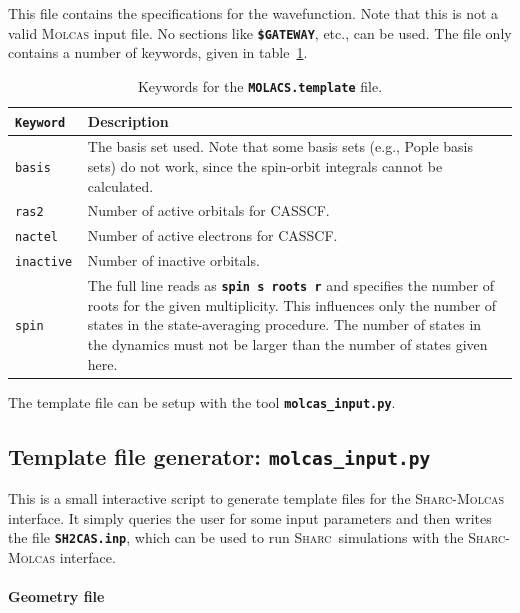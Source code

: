 \documentclass[a4paper,11pt,DIV=15,openany,twoside=false]{scrbook}
\newcommand{\sharc}{\textsc{Sharc}}
\newcommand{\ttt}[1]{\textbf{\texttt{#1}}}
\begin{document}
This file contains the specifications for the wavefunction. Note that this is not a valid \textsc{Molcas} input file. No sections like \ttt{\$GATEWAY}, etc., can be used. The file only contains a number of keywords, given in table~\ref{tab:molcas_temp}.

\begin{table}
  \centering
  \caption{Keywords for the \ttt{MOLACS.template} file.}
  \label{tab:molcas_temp}
  \begin{tabular}{>{\tt}lp{12cm}}
  \toprule
  Keyword       &Description\\
  \midrule
basis           &The basis set used. Note that some basis sets (e.g., Pople basis sets) do not work, since the spin-orbit integrals cannot be calculated.\\
ras2            &Number of active orbitals for CASSCF.\\
nactel          &Number of active electrons for CASSCF.\\
inactive        &Number of inactive orbitals.\\
spin            &The full line reads as \ttt{spin s roots r} and specifies the number of roots for the given multiplicity. This influences only the number of states in the state-averaging procedure. The number of states in the dynamics must not be larger than the number of states given here.\\
  \bottomrule
  \end{tabular}
\end{table}

The template file can be setup with the tool \ttt{molcas\_input.py}.

\subsection{Template file generator: \ttt{molcas\_input.py}}\label{sec:molcas_input.py}

This is a small interactive script to generate template files for the \sharc-\textsc{Molcas} interface. It simply queries the user for some input parameters and then writes the file \ttt{SH2CAS.inp}, which can be used to run \sharc\ simulations with the \sharc-\textsc{Molcas} interface.

\paragraph{Geometry file}
\end{document}
